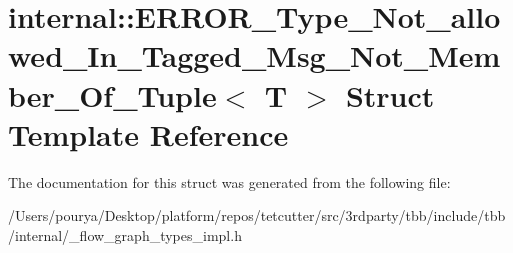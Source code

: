 \hypertarget{structinternal_1_1ERROR__Type__Not__allowed__In__Tagged__Msg__Not__Member__Of__Tuple}{}\section{internal\+:\+:E\+R\+R\+O\+R\+\_\+\+Type\+\_\+\+Not\+\_\+allowed\+\_\+\+In\+\_\+\+Tagged\+\_\+\+Msg\+\_\+\+Not\+\_\+\+Member\+\_\+\+Of\+\_\+\+Tuple$<$ T $>$ Struct Template Reference}
\label{structinternal_1_1ERROR__Type__Not__allowed__In__Tagged__Msg__Not__Member__Of__Tuple}


The documentation for this struct was generated from the following file\+:\begin{DoxyCompactItemize}
\item 
/\+Users/pourya/\+Desktop/platform/repos/tetcutter/src/3rdparty/tbb/include/tbb/internal/\+\_\+flow\+\_\+graph\+\_\+types\+\_\+impl.\+h\end{DoxyCompactItemize}
